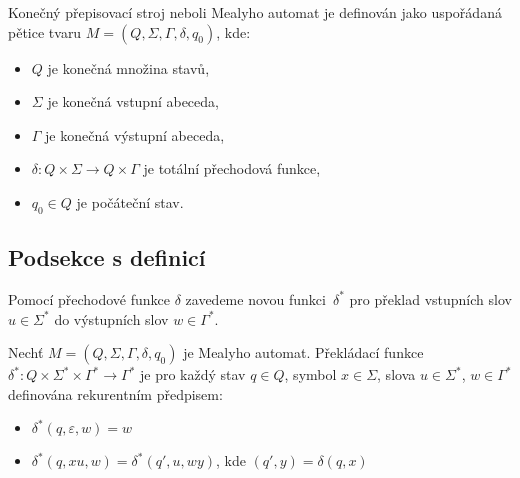 \documentclass[a4paper, twocolumn, 11pt]{article}
\begin{document}
\begin{definition}
\label{def1}
\textnormal{Konečný přepisovací stroj} neboli 
\textnormal{Mea\-lyho automat} je definován jako uspořádaná pětice tvaru 
$M = (Q, \varSigma, \varGamma, \delta, q_0)$, kde:


\begin{itemize}
  \item $Q$ je konečná množina \textnormal{stavů},
  \item $\varSigma$ je konečná \textnormal{vstupní abeceda},
  \item $\varGamma$ je konečná \textnormal{výstupní abeceda},
  \item $\delta: Q \times \varSigma \rightarrow Q \times \varGamma$ je totální \textnormal{přechodová funkce},
  \item $q_0 \in Q$ je \textnormal{počáteční stav}.
\end{itemize}


\end{definition}


\subsection{Podsekce s definicí}
\par Pomocí přechodové funkce $\delta$ zavedeme novou funkci~$\delta^*$
    pro překlad vstupních slov $u \in \varSigma^*$ do výstupních slov $w \in \varGamma^*$.

\begin{definition}
    Nechť $M = (Q, \varSigma, \varGamma, \delta, q_0)$ je Mealyho automat. 
    \textnormal{Překládací funkce} $\delta^* : Q \times \varSigma^* \times \varGamma^* \rightarrow \varGamma^*$
    je pro každý stav $q \in Q$, symbol $x \in \varSigma$, slova $u \in \varSigma^*$,
    $w \in \varGamma^*$ definována rekurentním předpisem:  
    \begin{itemize}
    \item $\delta^*(q,\varepsilon,w) = w$  
    \item $\delta^*(q,xu,w) = \delta^*(q',u,wy)$, kde $(q', y) = \delta(q,x)$  
    \end{itemize}  
\end{definition}
\end{document}
